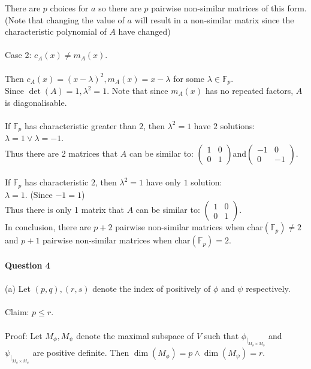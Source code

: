 \documentclass{article}
\begin{document}
There are $p$ choices for $a$ so there are $p$ pairwise non-similar matrices of this form. (Note that changing the value of $a$ will result in a non-similar matrix since the characteristic polynomial of $A$ have changed)\\\\
Case 2: $c_A(x) \neq m_A(x)$.\\\\
Then $c_A(x) = (x-\lambda)^2, m_A(x) = x-\lambda$ for some $\lambda \in \mathbb{F}_p$.\\ Since $\det(A)=1,\lambda^2 = 1$. Note that since $m_A(x)$ has no repeated factors, $A$ is diagonalisable.
\\\\
If $\mathbb{F}_p$ has characteristic greater than $2$, then $\lambda^2 = 1$ have $2$ solutions:\\ $\lambda = 1 \lor \lambda = -1$.\\ Thus there are 2 matrices that $A$ can be similar to: $ \begin{pmatrix}
1 & 0\\
0 & 1
\end{pmatrix} $and$ \begin{pmatrix}
-1 & 0\\
0 & -1
\end{pmatrix}.$\\\\
If $\mathbb{F}_p$ has characteristic $2$, then $\lambda^2 = 1$ have only $1$ solution:\\ $\lambda = 1.$ (Since $-1 = 1$)\\ Thus there is only 1 matrix that $A$ can be similar to: $ \begin{pmatrix}
1 & 0\\
0 & 1
\end{pmatrix}$.\\
In conclusion, there are $p+2$ pairwise non-similar matrices when char$(\mathbb{F}_p) \neq 2$ and $p+1$ pairwise non-similar matrices when char$(\mathbb{F}_p) = 2$.\\\\
\textbf{Question 4}\\\\
(a) Let $(p,q),(r,s)$ denote the index of positively of $\phi$ and $\psi$ respectively.\\\\
Claim: $p \leq r$.\\\\
Proof: Let $M_\phi,M_\psi$ denote the maximal subspace of $V$ such that $\phi_{|_{M_\phi\times M_\phi}}$ and $\psi_{|_{M_\psi\times M_\psi}}$ are positive definite. Then $\dim(M_\phi) = p \land \dim(M_\psi) = r$.\\\\
\end{document}
